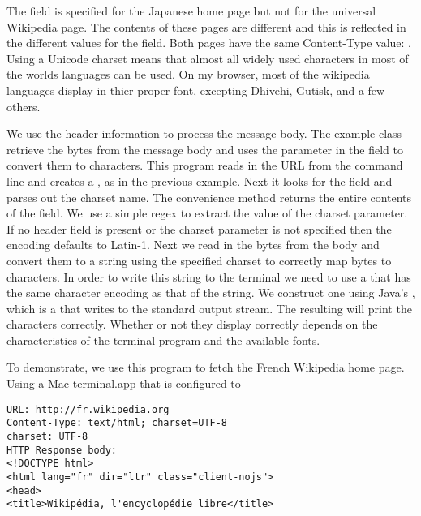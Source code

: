 %
The field  is specified for the Japanese home page
but not for the universal Wikipedia page.  The contents of these pages are different
and this is reflected in the different values for the  field.
Both pages have the same Content-Type value: .
Using a Unicode charset means that almost all widely used characters in most of the
worlds languages can be used.
On my browser, most of the wikipedia languages display in thier proper font, excepting
Dhivehi, Gutisk, and a few others.

We use the header information to process the message body.
The example class  retrieve the bytes from the message body and
uses the  parameter in the  field to convert them
to characters.  
%
%
This program reads in the URL from the command line and creates a ,
as in the previous example.  Next it looks for the  field and
parses out the charset name.
%
%
The convenience method  returns the entire contents
of the  field.
We use a simple regex to extract the value of the charset parameter.
If no header field is present or the charset parameter is not specified
then the encoding defaults to Latin-1.
%
%
Next we read in the bytes from the body and convert them to a string
using the specified charset to correctly map bytes to characters.
%
%
In order to write this string to the terminal we need to use a 
that has the same character encoding as that of the string.
We construct one using Java's , which is a 
that writes to the standard output stream.
The resulting  will print the characters correctly.
Whether or not they display correctly depends on the characteristics of the terminal program
and the available fonts.

To demonstrate, we use this program to fetch the French Wikipedia home page.
Using a Mac terminal.app that is configured to 






\begin{verbatim} 
URL: http://fr.wikipedia.org
Content-Type: text/html; charset=UTF-8
charset: UTF-8
HTTP Response body:
<!DOCTYPE html>
<html lang="fr" dir="ltr" class="client-nojs">
<head>
<title>Wikipédia, l'encyclopédie libre</title>
\end{verbatim}







